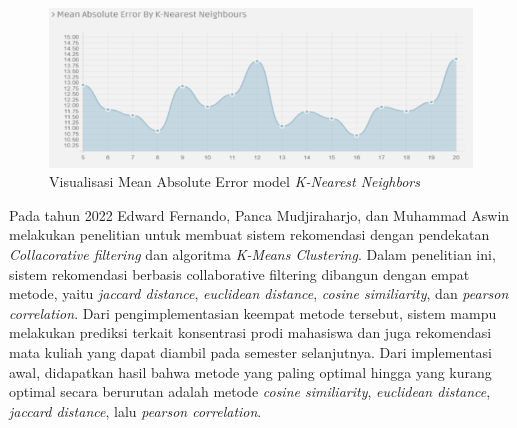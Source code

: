 \begin{figure} [ht] \centering
  \includegraphics{gambar/mae-knn.png}
  \vspace*{3mm}
  \caption{Visualisasi Mean Absolute Error model \emph{K-Nearest Neighbors} \citep{cosineSimilarity}}
\end{figure}


Pada tahun 2022 Edward Fernando, Panca Mudjiraharjo, dan Muhammad Aswin melakukan penelitian untuk membuat sistem rekomendasi
dengan pendekatan \emph{Collacorative filtering} dan algoritma \emph{K-Means Clustering}. Dalam penelitian ini, sistem rekomendasi
berbasis collaborative filtering dibangun dengan empat metode, yaitu \emph{jaccard distance}, \emph{euclidean distance}, \emph{cosine similiarity}, dan \emph{pearson correlation}.
Dari pengimplementasian keempat metode tersebut, sistem mampu melakukan prediksi terkait konsentrasi prodi mahasiswa dan juga rekomendasi mata kuliah
yang dapat diambil pada semester selanjutnya. Dari implementasi awal, didapatkan hasil bahwa metode yang paling optimal hingga yang kurang optimal
secara berurutan adalah metode \emph{cosine similiarity}, \emph{euclidean distance}, \emph{jaccard distance}, lalu \emph{pearson correlation}.

